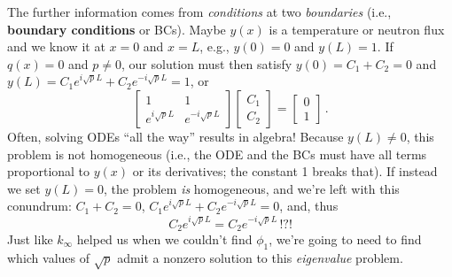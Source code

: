 \documentclass[compact]{ne630handout}
\begin{document}
\begin{handoutflow}


The further information comes from {\it conditions} at two {\it boundaries} (i.e., {\bf boundary conditions} or BCs).  Maybe $y(x)$ is a temperature or neutron flux and we know it at $x = 0$ and $x = L$, e.g., $y(0) = 0$ and $y(L) = 1$.  If $q(x) = 0$ and $p\neq 0$, our solution must then satisfy $y(0) = C_1 + C_2 = 0$ and $y(L) =  C_1 e^{i\sqrt{p}L} + C_2 e^{-i\sqrt{p}L}=1$, or
\begin{equation*}
 \begin{bmatrix}
  1 & 1 \\
  e^{i\sqrt{p}L} & e^{-i\sqrt{p}L}
 \end{bmatrix}
 \begin{bmatrix}
  C_1 \\
  C_2
 \end{bmatrix} =  \begin{bmatrix}
  0 \\
  1
 \end{bmatrix} \, .
\end{equation*}
Often, solving ODEs ``all the way'' results in algebra!  Because  $y(L) \neq 0$, this problem is not homogeneous (i.e., the ODE and the BCs must have all terms proportional to $y(x)$ or its derivatives; the constant 1 breaks that).  If instead we set $y(L) = 0$, the problem {\it is} homogeneous, and we're left with this conundrum:
$C_1 + C_2 = 0$, $C_1 e^{i\sqrt{p}L} + C_2 e^{-i\sqrt{p}L} = 0$, and, thus
\begin{equation*}
 C_2  e^{i\sqrt{p}L} = C_2  e^{-i\sqrt{p}L} \, !?!
\end{equation*}
Just like $k_{\infty}$ helped us when we couldn't find $\phi_1$, we're going to need to find which values of $\sqrt{p}$  admit a nonzero solution to this {\it eigenvalue} problem.

\end{handoutflow}
\end{document}
